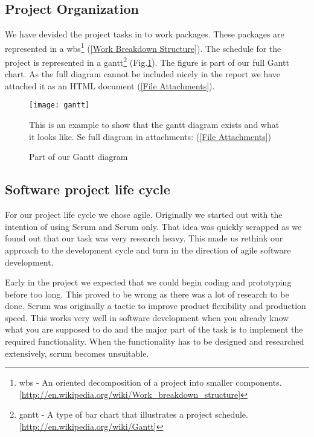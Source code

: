     

    \subsection{Project Organization}\label{Project Organization}
    
    We have devided the project tasks in to work packages. These packages are represented in a \gls{wbs}\footnote{\gls{wbs} - An oriented decomposition of a project into smaller components. [\url{http://en.wikipedia.org/wiki/Work_breakdown_structure}]} (\ref{Work Breakdown Structure}). The schedule for the project is represented in a \gls{gantt}\footnote{\gls{gantt} - A type of bar chart that illustrates a project schedule. [\url{http://en.wikipedia.org/wiki/Gantt}]} (Fig.\ref{fig:gantt}). The figure is part of our full Gantt chart. As the full diagram cannot be included nicely in the report we have attached it as an HTML document (\ref{File Attachments}).
     
        \begin{figure}[h]
            \centering
            \texttt{[image: gantt]}
            \caption{Part of our Gantt diagram} 
            This is an example to show that the gantt diagram exists and what it looks like. Se full diagram in attachments: (\ref{File Attachments})
            \label{fig:gantt}
        \end{figure}
    
    
    \subsection{Software project life cycle}\label{Software project life cycle}
    
    For our project life cycle we chose agile. Originally we started out with the intention of using Scrum and Scrum only. That idea was quickly scrapped as we found out that our task was very research heavy. This made us rethink our approach to the development cycle and turn in the direction of agile software development.
    
    Early in the project we expected that we could begin coding and prototyping before too long. This proved to be wrong as there was a lot of research to be done. Scrum was originally a tactic to improve product flexibility and production speed. This works very well in software development when you already know what you are supposed to do and the major part of the task is to implement the required functionality. When the functionality has to be designed and researched extensively, scrum becomes unsuitable. 
    
